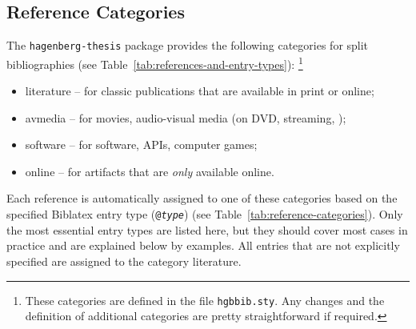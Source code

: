 \subsection{Reference Categories}
\label{sec:reference-categories}

The \texttt{hagenberg-thesis} package provides the following categories for split
bibliographies (see Table~\ref{tab:references-and-entry-types}):%
\footnote{These categories are defined in the file \nolinkurl{hgbbib.sty}. Any
changes and the definition of additional categories are pretty straightforward
if required.}
%
\begin{itemize}
    \item[] \textsf{literature} -- for classic publications that are available
    in print or online;
    \item[] \textsf{avmedia} -- for movies, audio-visual media (on DVD,
    streaming, \etc);
    \item[] \textsf{software} -- for software, APIs, computer games;
    \item[] \textsf{online} -- for artifacts that are \emph{only} available
    online.
\end{itemize}
%
Each reference is automatically assigned to one of these categories based on the
specified Biblatex entry type (\texttt{@\emph{type}}) (see
Table~\ref{tab:reference-categories}). Only the most essential entry types are
listed here, but they should cover most cases in practice and are explained
below by examples. All entries that are not explicitly specified are assigned to
the category \textsf{literature}.




